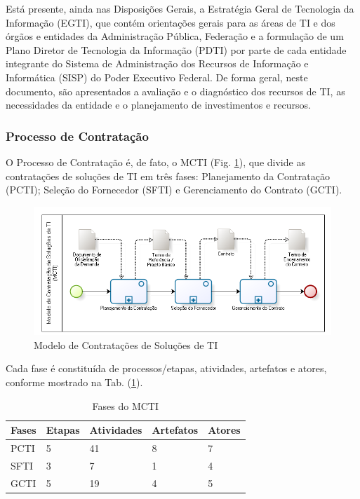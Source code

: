 Está presente, ainda nas Disposições Gerais, a Estratégia Geral de Tecnologia da Informação (EGTI), que contém orientações gerais para as áreas de TI e dos órgãos e entidades da Administração Pública, Federação e a formulação de um Plano Diretor de Tecnologia da Informação (PDTI) por parte de cada entidade integrante do Sistema de Administração dos Recursos de Informação e Informática (SISP) do Poder Executivo Federal. De forma geral, neste documento, são apresentados a avaliação e o diagnóstico dos recursos de TI, as necessidades da entidade e o planejamento de investimentos e recursos.

\subsubsection[Processo de Contratação]{Processo de Contratação}

O Processo de Contratação é, de fato, o MCTI (Fig. \ref{mcti}), que divide as contratações de soluções de TI em três fases: Planejamento da Contratação (PCTI); Seleção do Fornecedor (SFTI) e Gerenciamento do Contrato (GCTI).

\begin{figure}[h]
		\centering
		\label{fig05}
			\includegraphics[scale=0.8]{figuras/MCTI.png}
		\caption{Modelo de Contratações de Soluções de TI   \cite{mcti}}
\label{mcti}
\end{figure}


Cada fase é constituída de processos/etapas, atividades, artefatos e atores, conforme mostrado na Tab. (\ref{fmcti}).
  
\begin{table}[htb]
\center
\footnotesize
\begin{tabular}{|p{1.4cm}|p{1cm}|p{3cm}|p{3cm}|p{3cm}|}
  \hline
   \textbf{Fases} & \textbf{Etapas}  & \textbf{Atividades}  & \textbf{Artefatos} & \textbf{Atores}  \\
    \hline
    PCTI & 5 & 41 & 8 & 7\\
   \hline    
    SFTI & 3 & 7 & 1 & 4\\
    \hline
    GCTI & 5 & 19 & 4 & 5\\
   \hline
\end{tabular}
\caption{Fases do MCTI}
\label{fmcti}
\end{table}

